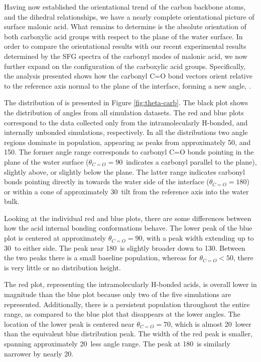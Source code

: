 Having now established the \thetaphi orientational trend of the carbon backbone atoms, and the \psipsi dihedral relationships, we have a nearly complete orientational picture of surface malonic acid. What remains to determine is the absolute orientation of both carboxylic acid groups with respect to the plane of the water surface. In order to compare the orientational results with our recent experimental results determined by the SFG spectra of the carbonyl modes of malonic acid,\cite{Blower2012} we now further expand on the configuration of the carboxylic acid groups. Specifically, the analysis presented shows how the carbonyl C=O bond vectors orient relative to the reference axis normal to the plane of the interface, forming a new angle, \thetacarb.

The distribution of \thetacarb is presented in Figure \ref{fig:theta-carb}. The black plot shows the distribution of angles from all simulation datasets. The red and blue plots correspond to the \thetacarb data collected only from the intramolecularly H-bonded, and internally unbonded simulations, respectively. In all the distributions two angle regions dominate in population, appearing as peaks from approximately 50\degr, and 150\degr. The former angle range corresponds to carbonyl C=O bonds pointing in the plane of the water surface ($\theta_{C=O}=90$\degr~indicates a carbonyl parallel to the plane), slightly above, or slightly below the plane. The latter range indicates carbonyl bonds pointing directly in towards the water side of the interface ($\theta_{C=O}=180$\degr) or within a cone of approximately 30\degr~tilt from the reference axis into the water bulk.

Looking at the individual red and blue plots, there are some differences between how the acid internal bonding conformations behave. The lower peak of the blue plot is centered at approximately $\theta_{C=O}=90$\degr, with a peak width extending up to 30\degr~to either side. The peak near 180\degr~is slightly broader down to 130\degr. Between the two peaks there is a small baseline population, whereas for $\theta_{C=O} < 50$\degr, there is very little or no distribution height.

The red plot, representing the intramolecularly H-bonded acids, is overall lower in magnitude than the blue plot because only two of the five simulations are represented. Additionally, there is a persistent population throughout the entire \thetacarb range, as compared to the blue plot that disappears at the lower angles. The location of the lower peak is centered near $\theta_{C=O}=70$\degr, which is almost 20\degr~lower than the equivalent blue distribution peak. The width of the red peak is smaller, spanning approximately 20\degr~less angle range. The peak at 180\degr~is similarly narrower by nearly 20\degr.

